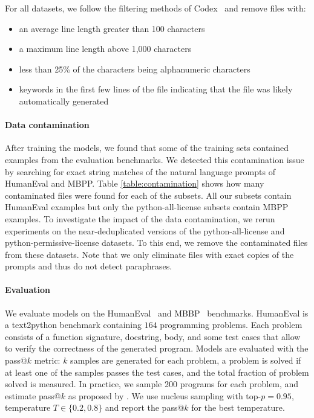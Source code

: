 For all datasets, we follow the filtering methods of Codex~\citep{chen2021codex} and remove files with:

\begin{itemize}
    \item an average line length greater than 100 characters \item a maximum line length above 1,000 characters \item less than 25\% of the characters being alphanumeric characters \item keywords in the first few lines of the file indicating that the file was likely automatically generated
\end{itemize}

\paragraph{Data contamination} After training the models, we found that some of the training sets contained examples from the evaluation benchmarks. We detected this contamination issue by searching for exact string matches of the natural language prompts of HumanEval and MBPP. Table \ref{table:contamination} shows how many contaminated files were found for each of the subsets. All our subsets contain HumanEval examples but only the python-all-license subsets contain MBPP examples. To investigate the impact of the data contamination, we rerun experiments on the near-deduplicated versions of the python-all-license and python-permissive-license datasets. To this end, we remove the contaminated files from these datasets. Note that we only eliminate files with exact copies of the prompts and thus do not detect paraphrases. 

\paragraph{Evaluation}
We evaluate models on the HumanEval~\citep{chen2021codex} and MBBP~\citep{austin2021program} benchmarks. HumanEval is a text2python benchmark containing $164$ programming problems. Each problem consists of a function signature, docstring, body, and some test cases that allow to verify the correctness of the generated program. Models are evaluated with the pass@$k$ metric: $k$ samples are generated for each problem, a problem is solved if at least one of the samples passes the test cases, and the total fraction of problem solved is measured. In practice, we sample 200 programs for each problem, and estimate pass@$k$ as proposed by \citet{chen2021codex}. We use nucleus sampling with top-$p=0.95$, temperature $T\in \{0.2, 0.8\}$ and report the pass@$k$ for the best temperature.

